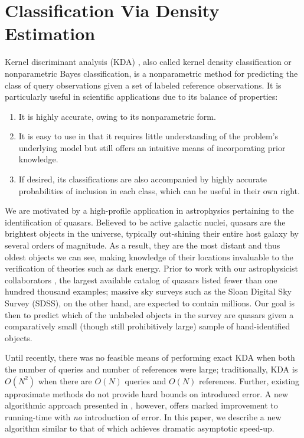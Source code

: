 \documentclass[twoside,leqno,twocolumn]{article}
\begin{document}
\section{Classification Via Density Estimation}
Kernel discriminant analysis (KDA) \cite{fix-hodges}, also called
kernel density classification \cite{hastie-tib-frie} or nonparametric
Bayes classification, is a nonparametric method for predicting the
class of query observations given a set of labeled reference
observations.  It is particularly useful in scientific applications
due to its balance of properties:
\begin{enumerate}
\item It is highly accurate, owing to its nonparametric form.
\item It is easy to use in that it requires little understanding of
  the problem's underlying model but still offers an intuitive means
  of incorporating prior knowledge.
\item If desired, its classifications are also accompanied by highly
  accurate probabilities of inclusion in each class, which can be
  useful in their own right.
\end{enumerate}

We are motivated by a high-profile application in astrophysics
pertaining to the identification of quasars.  Believed to be active
galactic nuclei, quasars are the brightest objects in the universe,
typically out-shining their entire host galaxy by several orders of
magnitude.  As a result, they are the most distant and thus oldest
objects we can see, making knowledge of their locations invaluable to
the verification of theories such as dark energy.  Prior to work with
our astrophysicist collaborators \cite{richards04}, the largest
available catalog of quasars listed fewer than one hundred thousand
examples; massive sky surveys such as the Sloan Digital Sky Survey
(SDSS), on the other hand, are expected to contain millions.  Our goal
is then to predict which of the unlabeled objects in the survey are
quasars given a comparatively small (though still prohibitively large)
sample of hand-identified objects.

Until recently, there was no feasible means of performing exact KDA
when both the number of queries and number of references were large;
traditionally, KDA is $O(N^2)$ when there are $O(N)$ queries and
$O(N)$ references.  Further, existing approximate methods do not
provide hard bounds on introduced error.  A new algorithmic approach
presented in \cite{nbc-compstat}, however, offers marked improvement
to running-time with {\em no} introduction of error.  In this paper,
we describe a new algorithm similar to that of \cite{nbc-compstat}
which achieves dramatic asymptotic speed-up.
\end{document}
